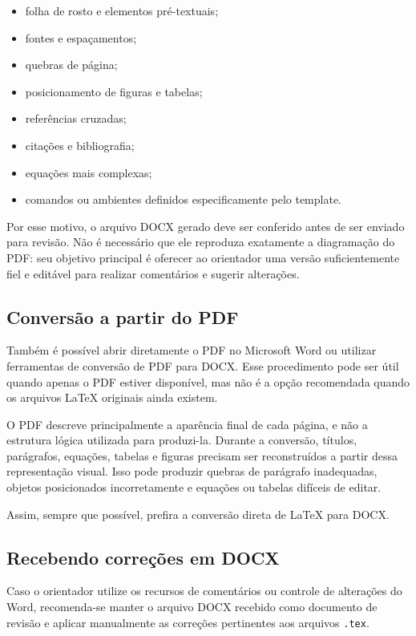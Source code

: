 \begin{itemize}
\item folha de rosto e elementos pré-textuais;
\item fontes e espaçamentos;
\item quebras de página;
\item posicionamento de figuras e tabelas;
\item referências cruzadas;
\item citações e bibliografia;
\item equações mais complexas;
\item comandos ou ambientes definidos especificamente pelo template.
\end{itemize}

Por esse motivo, o arquivo DOCX gerado deve ser conferido antes de ser
enviado para revisão. Não é necessário que ele reproduza exatamente a
diagramação do PDF: seu objetivo principal é oferecer ao orientador uma
versão suficientemente fiel e editável para realizar comentários e
sugerir alterações.

\subsection{Conversão a partir do PDF}
\label{ssec:conversao_pdf_docx}

Também é possível abrir diretamente o PDF no Microsoft Word ou utilizar ferramentas de conversão de PDF para DOCX. Esse procedimento pode ser útil quando apenas o PDF estiver disponível, mas não é a opção recomendada quando os arquivos LaTeX originais ainda existem.

O PDF descreve principalmente a aparência final de cada página, e não a estrutura lógica utilizada para produzi-la. Durante a conversão, títulos, parágrafos, equações, tabelas e figuras precisam ser reconstruídos a partir dessa representação visual. Isso pode produzir quebras de parágrafo inadequadas, objetos posicionados incorretamente e equações ou tabelas difíceis de editar.

Assim, sempre que possível, prefira a conversão direta de LaTeX para DOCX.

\subsection{Recebendo correções em DOCX}
\label{ssec:correcoes_docx}

Caso o orientador utilize os recursos de comentários ou controle de alterações do Word, recomenda-se manter o arquivo DOCX recebido como documento de revisão e aplicar manualmente as correções pertinentes aos arquivos \verb|.tex|.

